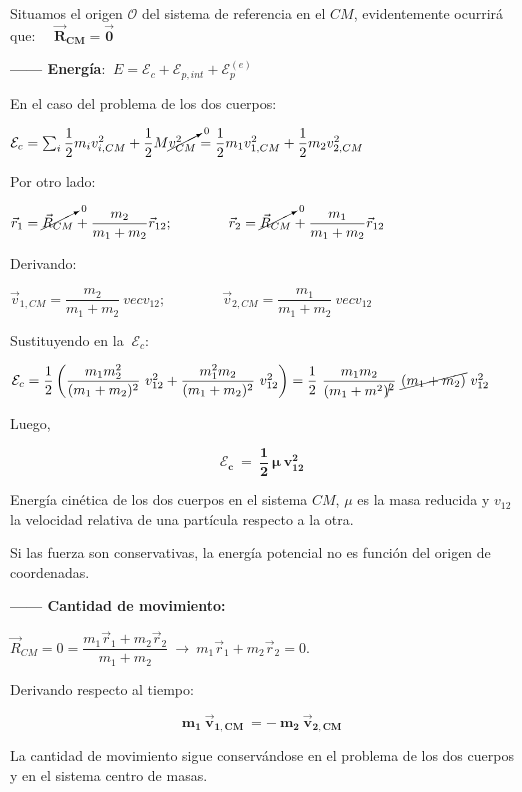 Situamos el origen $\mathcal O$ del sistema de referencia en el $CM$, evidentemente ocurrirá que: $\quad \boldsymbol {\overrightarrow{R}_{CM}=\vec 0}$

\textbf{------ Energía}: $\ E=\mathcal E_c+\mathcal E_{p,int} + \mathcal E_p^{(e)}$

En el caso del problema de los dos cuerpos:

$\mathcal E_c=\sum_i \dfrac 1 2 m_i v_{i,CM}^2+\dfrac 1 2 M \cancelto{0}{v_{CM}^2}=\dfrac 1 2 m_1 v_{1,CM}^2 +\dfrac 1 2 m_2 v_{2,CM}^2$

Por otro lado:

$\vec r_1=\cancelto{0}{\vec R_{CM}}+\dfrac{m_2}{m_1+m_2}\vec r_{12}; \qquad \qquad \vec r_2=\cancelto{0}{\vec R_{CM}}+\dfrac{m_1}{m_1+m_2}\vec r_{12}$

Derivando:

$\vec v_{1,CM}=\dfrac {m_2}{m_1+m_2}\ vec v_{12}; \qquad \qquad \vec v_{2,CM}=\dfrac {m_1}{m_1+m_2}\ vec v_{12}$

Sustituyendo en la $\ \mathcal E_c$:

\small{$\mathcal E_c= \dfrac 1 2 \left( \dfrac {m_1m_2^2}{(m_1+m_2)^2}\ v_{12}^2+  \dfrac {m_1^2m_2}{(m_1+m_2)^2}\ v_{12}^2  \right) = \dfrac 1 2 \ \dfrac{m_1m_2}{(m_1+m^2)^{\cancel{}2}}\ \cancel{(m_1+m_2)} \ v_{12}^2$}
 
 \normalsize{Luego,}
 
 \begin{equation}
 \boldsymbol{ \mathcal E_c \ = \ \dfrac 1 2 \ \mu \ v_{12}^2	 }
 \end{equation}

Energía cinética de los dos cuerpos en el sistema $CM$, $\mu$ es la masa reducida y $v_{12}$ la velocidad relativa de una partícula respecto a la otra.

Si las fuerza son conservativas, la energía potencial no es función del origen de coordenadas.

\textbf{------ Cantidad de movimiento:}

$\overrightarrow R_{CM}=0=\dfrac{m_1 \vec r_1 + m_2 \vec r_2}{m_1+m_2} \ \to \ m_1 \vec r_1 + m_2 \vec r_2=0$. 

Derivando respecto al tiempo:

\begin{equation}
\boldsymbol{
m_1 \ \vec v_{1,CM }\ = - \ m_2 \ \vec v_{2,CM}
}	
\end{equation}

La cantidad de movimiento sigue conservándose en el problema de los dos cuerpos y en el sistema centro de masas.

